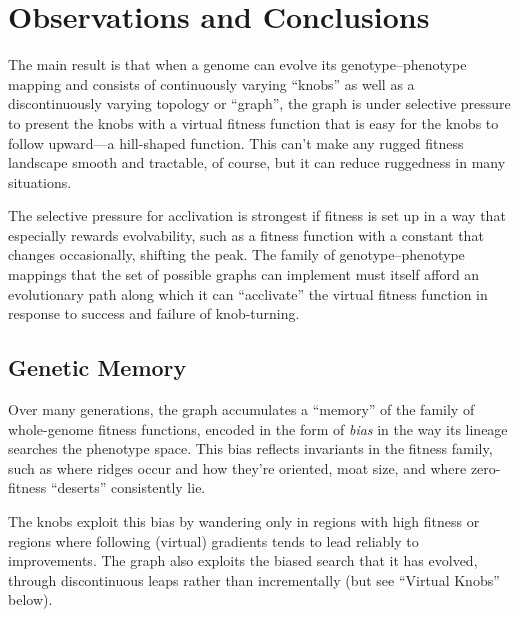 \documentclass[letterpaper]{article}
\begin{document}
\section{Observations and Conclusions}

The main result is that when a genome can evolve its genotype--phenotype
mapping and consists of continuously varying ``knobs'' as well as a
discontinuously varying topology or ``graph'', the graph is under selective
pressure to present the knobs with a virtual fitness function that is easy for
the knobs to follow upward---a hill-shaped function. This can't make any
rugged fitness landscape smooth and tractable, of course, but it can reduce
ruggedness in many situations.

The selective pressure for acclivation is strongest if fitness is set up in a
way that especially rewards evolvability, such as a fitness function with a
constant that changes occasionally, shifting the peak. The family of
genotype--phenotype mappings that the set of possible graphs can implement must
itself afford an evolutionary path along which it can ``acclivate'' the virtual
fitness function in response to success and failure of knob-turning.


\subsection{Genetic Memory}

Over many generations, the graph accumulates a ``memory'' of the family of
whole-genome fitness functions, encoded in the form of \textit{bias} in the way
its lineage searches the phenotype space. This bias reflects invariants in the
fitness family, such as where ridges occur and how they're oriented, moat size,
and where zero-fitness ``deserts'' consistently lie.

The knobs exploit this bias by wandering only in regions with high fitness or
regions where following (virtual) gradients tends to lead reliably to
improvements. The graph also exploits the biased search that it has evolved,
through discontinuous leaps rather than incrementally (but see ``Virtual
Knobs'' below).
\end{document}
